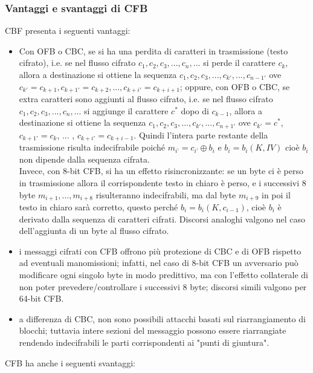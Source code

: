 \subsubsection{Vantaggi e svantaggi  di CFB}
CBF presenta i seguenti vantaggi:
\begin{itemize}
\item Con OFB o CBC, se si ha una perdita di caratteri in trasmissione (testo cifrato), i.e. se nel flusso cifrato $c_{1}, c_{2}, c_{3}, ... , c_{n}, ...$ si perde il carattere $c_{k}$, allora a destinazione si ottiene la sequenza $c_{1}, c_{2}, c_{3}, ... , c_{k'}, ... , c_{n-1'}$ ove $c_{k'} = c_{k+1}, c_{k+1'} = c_{k+2}, ... , c_{k+i'} = c_{k+i+1}$; oppure, con OFB o CBC, se extra caratteri sono aggiunti al flusso cifrato, i.e. se nel flusso cifrato $c_{1}, c_{2}, c_{3}, ... , c_{n}, ...$ si aggiunge il carattere $c^{*}$ dopo di $c_{k-1}$, allora a destinazione si ottiene la sequenza $c_{1}, c_{2}, c_{3}, ... , c_{k'}, ... , c_{n+1'}$ ove $c_{k'} = c^{*}$, $c_{k+1'} = c_{k}$, $...$ , $c_{k+i'} = c_{k+i-1}$. Quindi l'intera parte restante della trasmissione risulta indecifrabile poiché $m_{i’} = c_{i’} \oplus b_{i}$ e $b_{i} = b_{i}(K, IV)$ cioè $b_{i}$ non dipende dalla sequenza cifrata. \\
Invece, con 8-bit CFB, si ha un effetto risincronizzante: se un byte ci è perso in trasmissione allora il corrispondente testo in chiaro è perso, e i successivi 8 byte $m_{i+1}, …, m_{i+8}$ risulteranno indecifrabili, ma dal byte $m_{i+9}$ in poi il testo in chiaro sarà corretto, questo perché $b_{i} = b_{i}(K, c_{i-1})$, cioè $b_{i}$ è derivato dalla sequenza di caratteri cifrati. Discorsi analoghi valgono nel caso dell'aggiunta di un byte al flusso cifrato.
\item i messaggi cifrati con CFB offrono più protezione di CBC e di OFB rispetto ad eventuali manomissioni; infatti, nel caso di 8-bit CFB un avversario può modificare ogni singolo byte in modo predittivo, ma con l'effetto collaterale di non poter prevedere/controllare i successivi 8 byte; discorsi simili valgono per 64-bit CFB.
\item a differenza di CBC, non sono possibili attacchi basati sul riarrangiamento di blocchi; tuttavia intere sezioni del messaggio possono essere riarrangiate rendendo indecifrabili le parti corrispondenti ai "punti di giuntura".
\end{itemize}
CFB ha anche i seguenti svantaggi:
